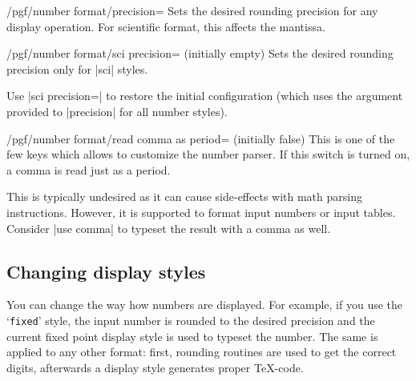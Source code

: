 \begin{key}{/pgf/number format/precision=}
    Sets the desired rounding precision for any display operation. For
    scientific format, this affects the mantissa.
\end{key}

\begin{key}{/pgf/number format/sci precision= (initially empty)}
    Sets the desired rounding precision only for |sci| styles.

    Use |sci precision={}| to restore the initial configuration (which uses the
    argument provided to |precision| for all number styles).
\end{key}

\begin{key}{/pgf/number format/read comma as period= (initially false)}
    This is one of the few keys which allows to customize the number parser. If
    this switch is turned on, a comma is read just as a period.
\begin{codeexample}[pre={\begin{lateximage}},post={\end{lateximage}}]
\end{codeexample}
    This is typically undesired as it can cause side-effects with math parsing
    instructions. However, it is supported to format input numbers or input
    tables. Consider |use comma| to typeset the result with a comma as well.
\begin{codeexample}[pre={\begin{lateximage}},post={\end{lateximage}}]
\end{codeexample}
\end{key}


\subsection{Changing display styles}%
\label{sec:number:styles}

You can change the way how numbers are displayed. For example, if you use the
`\texttt{fixed}' style, the input number is rounded to the desired precision
and the current fixed point display style is used to typeset the number. The
same is applied to any other format: first, rounding routines are used to get
the correct digits, afterwards a display style generates proper \TeX-code.

